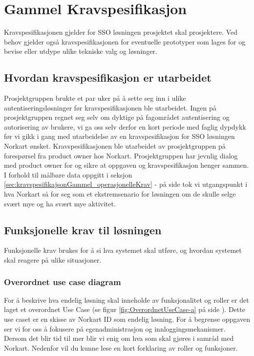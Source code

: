 \chapter{Gammel Kravspesifikasjon}
\label{chap:kravspesifikasjonGammel}
Kravspesifikasjonen gjelder for SSO løsningen prosjektet skal prosjektere. Ved behov gjelder også kravspesifikasjonen for eventuelle prototyper som lages for og bevise eller utdype ulike tekniske valg og løsninger.

\section{Hvordan kravspesifikasjon er utarbeidet}
\label{sec:kravspesifikasjonGammel_hvordanKravspesifikajsonErUtarbeidet}
Prosjektgruppen brukte et par uker på å sette seg inn i ulike autentiseringsløsninger før kravspesifikasjonen ble utarbeidet. Ingen på prosjektgruppen regnet seg selv om dyktige på fagområdet autentisering og autorisering av brukere, vi ga oss selv derfor en kort periode med faglig dypdykk før vi gikk i gang med utarbeidelse av en kravspesifikasjon for SSO løsningen Norkart ønsket.
\bigskip
Kravspesifikasjonen ble utarbeidet av prosjektgruppen på forespørsel fra product owner hos Norkart. Prosjektgruppen har jevnlig dialog med product owner for og sikre at oppgaven og kravspesifikasjon henger sammen.
\bigskip
I forhold til målbare data oppgitt i seksjon \ref{sec:kravspesifikajsonGammel_operasjonelleKrav} -   på side \pageref{sec:kravspesifikajson_operasjonelleKrav} tok vi utgangspunkt i hva Norkart så for seg som et ekstremsenario for løsningen om de skulle selge svært mye og ha svært mye aktivitet. 

\section{Funksjonelle krav til løsningen}
\label{sec:kravspesifikajsonGammel_funksjonelleKrav}
Funksjonelle krav brukes for å si hva systemet skal utføre, og hvordan systemet skal reagere på ulike situasjoner. 

\subsection{Overordnet use case diagram}
\label{subsec:kravspesifikajsonGammel_funksjonelleKrav_overordnetUseCase}
For å beskrive hva endelig løsning skal inneholde av funksjonalitet og roller er det laget et overordnet Use Case (se figur \ref{fig:OverordnetUseCase-a} på side \pageref{fig:OverordnetUseCase}). Dette use caset er en skisse av Norkart ID som endelig løsning. For å begrense oppgaven ser vi for oss å fokusere på egenadministrasjon og innloggingsmekanismer. Dersom det blir tid til mer blir vi enig om hva som skal gjøres i samråd med Norkart. Nedenfor vil du kunne lese en kort forklaring av roller og funksjoner.

